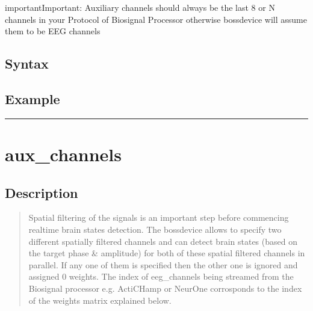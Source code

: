 \documentclass[letterpaper,10pt,english]{sphinxmanual}
\begin{document}
\begin{sphinxadmonition}{important}{Important:}
Auxiliary channels should always be the last 8 or N channels in your Protocol of Biosignal Processor otherwise bossdevice will assume them to be EEG channels
\end{sphinxadmonition}


\subsection{Syntax}
\label{\detokenize{4_api_documentation:id17}}
\begin{sphinxVerbatim}[commandchars=\\\{\}]
\PYG{p}{[}\PYG{p}{]} 
\end{sphinxVerbatim}


\subsection{Example}
\label{\detokenize{4_api_documentation:id18}}
\begin{sphinxVerbatim}[commandchars=\\\{\}]
 
 
\end{sphinxVerbatim}


\bigskip\hrule\bigskip



\section{aux\_channels}
\label{\detokenize{4_api_documentation:id19}}

\subsection{Description}
\label{\detokenize{4_api_documentation:id20}}\begin{quote}

Spatial filtering of the signals is an important step before commencing real\sphinxhyphen{}time brain states detection. The bossdevice allows to specify two different spatially filtered channels and can detect brain states (based on the target phase \& amplitude) for both of these spatial filtered channels in parallel. If any one of them is specified then the other one is ignored and assigned 0 weights. The index of eeg\_channels being streamed from the Biosignal processor e.g. ActiCHamp or NeurOne corrosponds to the index of the weights matrix explained below.
\end{quote}
\end{document}
